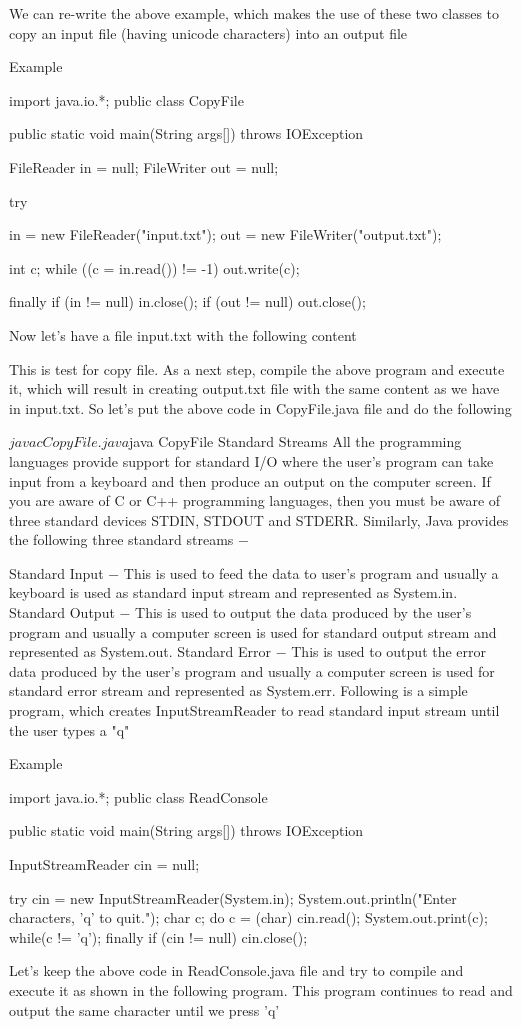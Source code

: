 We can re-write the above example, which makes the use of these two classes to copy an input file (having unicode characters) into an output file

Example

import java.io.*;
public class CopyFile {

   public static void main(String args[]) throws IOException {
      FileReader in = null;
      FileWriter out = null;

      try {
         in = new FileReader("input.txt");
         out = new FileWriter("output.txt");

         int c;
         while ((c = in.read()) != -1) {
            out.write(c);
         }
      }finally {
         if (in != null) {
            in.close();
         }
         if (out != null) {
            out.close();
         }
      }
   }
}
Now let's have a file input.txt with the following content

This is test for copy file.
As a next step, compile the above program and execute it, which will result in creating output.txt file with the same content as we have in input.txt. So let's put the above code in CopyFile.java file and do the following

$javac CopyFile.java
$java CopyFile
Standard Streams
All the programming languages provide support for standard I/O where the user's program can take input from a keyboard and then produce an output on the computer screen. If you are aware of C or C++ programming languages, then you must be aware of three standard devices STDIN, STDOUT and STDERR. Similarly, Java provides the following three standard streams −

Standard Input − This is used to feed the data to user's program and usually a keyboard is used as standard input stream and represented as System.in.
Standard Output − This is used to output the data produced by the user's program and usually a computer screen is used for standard output stream and represented as System.out.
Standard Error − This is used to output the error data produced by the user's program and usually a computer screen is used for standard error stream and represented as System.err.
Following is a simple program, which creates InputStreamReader to read standard input stream until the user types a "q"

Example

import java.io.*;
public class ReadConsole {

   public static void main(String args[]) throws IOException {
      InputStreamReader cin = null;

      try {
         cin = new InputStreamReader(System.in);
         System.out.println("Enter characters, 'q' to quit.");
         char c;
         do {
            c = (char) cin.read();
            System.out.print(c);
         } while(c != 'q');
      }finally {
         if (cin != null) {
            cin.close();
         }
      }
   }
}
Let's keep the above code in ReadConsole.java file and try to compile and execute it as shown in the following program. This program continues to read and output the same character until we press 'q'

